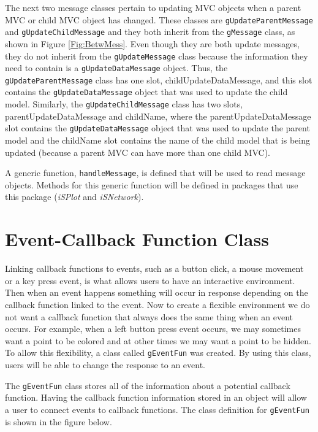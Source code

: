 \documentclass[11pt]{article}
\newcommand{\Rfunction}[1]{{\texttt{#1}}}
\newcommand{\Robject}[1]{{\texttt{#1}}}
\newcommand{\Rpackage}[1]{{\textit{#1}}}
\begin{document}
The next two message classes pertain to updating MVC objects when a parent MVC
or child MVC object has changed.  These classes are
\Robject{gUpdateParentMessage} and \Robject{gUpdateChildMessage} and they both
inherit from the \Robject{gMessage} class, as shown in Figure
\ref{Fig:BetwMess}.  Even though they are both update messages, they do not
inherit from the \Robject{gUpdateMessage} class because the information they
need to contain is a \Robject{gUpdateDataMessage} object.  Thus, the
\Robject{gUpdateParentMessage} class has one slot, childUpdateDataMessage, and
this slot contains the \Robject{gUpdateDataMessage} object that was used to
update the child model.  Similarly, the \Robject{gUpdateChildMessage} class
has two slots, parentUpdateDataMessage and childName, where the
parentUpdateDataMessage slot contains the \Robject{gUpdateDataMessage} object
that was used to update the parent model and the childName slot contains the
name of the child model that is being updated (because a parent MVC can have
more than one child MVC). 

A generic function, \Rfunction{handleMessage}, is defined that will be used to 
read message objects.  Methods for this generic function will be defined in 
packages that use this package (\Rpackage{iSPlot} and \Rpackage{iSNetwork}).

\section{Event-Callback Function Class}\label{Sec:EventFun}

Linking callback functions to events, such as a button click, a mouse movement
or a key press event, is what allows users to have an interactive
environment.  Then when an event happens something will occur in response
depending on the callback function linked to the event.  Now to create a
flexible environment we do not want a callback function that always does the
same thing when an event occurs.  For example, when a left button press event
occurs, we may sometimes want a point to be colored and at other times we may
want a point to be hidden.  To allow this flexibility, a class called
\Robject{gEventFun} was created.  By using this class, users will be able to
change the response to an event.  

The \Robject{gEventFun} class stores all of the information about a potential
callback function.  Having the callback function information stored in an 
object will allow a user to connect events to callback functions.  The class 
definition for \Robject{gEventFun} is shown in the figure below.
\end{document}
